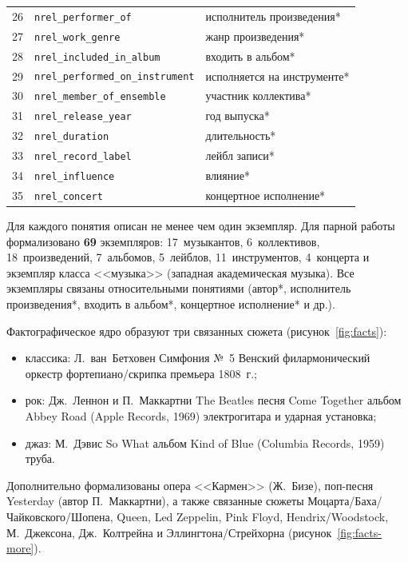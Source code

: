 \begin{table}[H]
\begin{tabular}{|c|p{6.2cm}|p{5.5cm}|}
26 & \texttt{nrel\_performer\_of} & исполнитель произведения* \\
27 & \texttt{nrel\_work\_genre} & жанр произведения* \\
28 & \texttt{nrel\_included\_in\_album} & входить в альбом* \\
29 & \texttt{nrel\_performed\_on\_instrument} & исполняется на инструменте* \\
30 & \texttt{nrel\_member\_of\_ensemble} & участник коллектива* \\
31 & \texttt{nrel\_release\_year} & год выпуска* \\
32 & \texttt{nrel\_duration} & длительность* \\
33 & \texttt{nrel\_record\_label} & лейбл записи* \\
34 & \texttt{nrel\_influence} & влияние* \\
35 & \texttt{nrel\_concert} & концертное исполнение* \\
\hline
\end{tabular}
\end{table}

Для каждого понятия описан не менее чем один экземпляр. Для парной работы формализовано \textbf{69} экземпляров: 17~музыкантов, 6~коллективов, 18~произведений, 7~альбомов, 5~лейблов, 11~инструментов, 4~концерта и экземпляр класса <<музыка>> (западная академическая музыка). Все экземпляры связаны относительными понятиями (автор*, исполнитель произведения*, входить в альбом*, концертное исполнение* и др.).

Фактографическое ядро образуют три связанных сюжета (рисунок~\ref{fig:facts}):
\begin{itemize}
	\item классика: Л.~ван~Бетховен \mdash Симфония №~5 \mdash Венский филармонический оркестр \mdash фортепиано/скрипка \mdash премьера 1808~г.;
	\item рок: Дж.~Леннон и П.~Маккартни \mdash The Beatles \mdash песня Come Together \mdash альбом Abbey Road (Apple Records, 1969) \mdash электрогитара и ударная установка;
	\item джаз: М.~Дэвис \mdash So What \mdash альбом Kind of Blue (Columbia Records, 1959) \mdash труба.
\end{itemize}
Дополнительно формализованы опера <<Кармен>> (Ж.~Бизе), поп-песня Yesterday (автор \mdash П.~Маккартни), а также связанные сюжеты Моцарта/Баха/Чайковского/Шопена, Queen, Led Zeppelin, Pink Floyd, Hendrix/Woodstock, М.~Джексона, Дж.~Колтрейна и Эллингтона/Стрейхорна (рисунок~\ref{fig:facts-more}).

